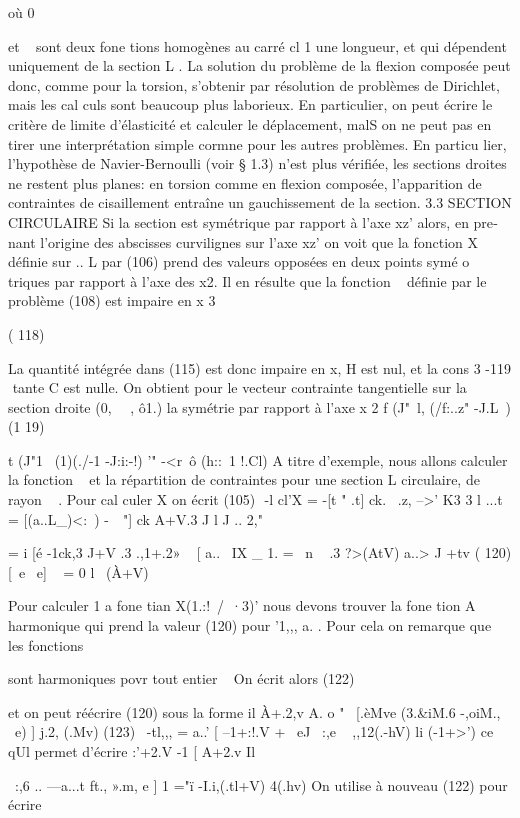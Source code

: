 où 0{ et ~ sont deux fone tions homogènes au carré cl 1 une longueur, et qui 
dépendent uniquement de la section L . 
La solution du problème de la flexion composée peut donc, comme pour la torsion, s'obtenir par résolution de problèmes de Dirichlet, mais les cal­
culs sont beaucoup plus laborieux. En particulier, on peut écrire le critère de limite d'élasticité et calculer le déplacement, malS on ne peut pas en 
tirer une interprétation simple cormne pour les autres problèmes. En particu­
lier, l'hypothèse de Navier-Bernoulli (voir § 1.3) n'est plus vérifiée, les 
sections droites ne restent plus planes: en torsion comme en flexion composée, l'apparition de contraintes de cisaillement entraîne un gauchissement de la section. 
3.3 SECTION CIRCULAIRE 
Si la section est symétrique par rapport à l'axe xz' alors, en pre­nant l'origine des abscisses curvilignes sur l'axe xz' on voit que la fonction X définie sur .. L par (106) prend des valeurs opposées en deux points symé­
o 
triques par rapport à l'axe des x2. Il en résulte que la fonction ~ définie par le problème (108) est impaire en x
3 

( 118) 


La quantité intégrée dans (115) est donc impaire en x, H est nul, et la cons­
3 
-119 ­
tante C est nulle. On obtient pour le vecteur contrainte tangentielle sur la section droite (0, ~~, ô1.) la symétrie par rapport à l'axe x
2 f (J"~l, (/f:..z" -J.L~)
(1 19) 


t (J"1~ (1)(./-1 -J:i:-!) '" -<r~ô (h::~1 !.Cl) 
A titre d'exemple, nous allons calculer la fonction ~ et la répar­tition de contraintes pour une section L circulaire, de rayon ~ . Pour cal­
culer X on écrit (105)
 
-l
cl'X = -[t " .t] ck. 
~.z, --\+>' K3 3
l 
...t 
= [(a..L_)<:~) -~~"] ck
A+V.3 J
l 
J .. 2," 

= i [é -1ck,3
J+V .3 .,1+.2»
~ [ a..~ IX _
1. = ~n
~ .3 ?>(AtV) 
a..> J +tv
( 120) [~e ~e]
~ = 
0 l ~(À+V) 

Pour calculer 1 a fone tian X(1.:!~/~·3)' nous devons trouver la fone tion A 
harmonique qui prend la valeur (120) pour '1,,, a. . Pour cela on remarque que
 
les fonctions 


sont harmoniques povr tout entier ~ On écrit alors 
(122) 

et on peut réécrire (120) sous la forme 
il À+.2,v
A. o " ~[.èMve (3.&iM.6 -,oiM., ~e) ] j.2, (.Mv)
(123) 
~-tl,,, 
= a..' [ --1+:!.V + ~eJ
~:,e ~ ,,12(.-hV) li (-1+>') 
ce qUl permet d'écrire 
:'+2.V
-1 [ A+2.v Il} ~:,6 .. ---a...t ft., ».m, e ] 1 ="ï -I.i,(.tl+V) 4(.hv) 
On utilise à nouveau (122) pour écrire 

